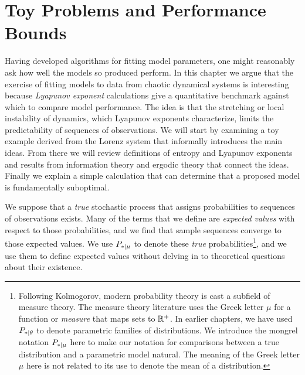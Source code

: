 

\chapter{Toy Problems and Performance Bounds}
\label{chap:toys}

Having developed algorithms for fitting model parameters, one might
reasonably ask how well the models so produced perform.  In this
chapter we argue that the exercise of fitting models to data from
chaotic dynamical systems is interesting because \emph{Lyapunov
  exponent} calculations give a quantitative benchmark against which
to compare model performance.  The idea is that the stretching or
local instability of dynamics, which Lyapunov exponents characterize,
limits the predictability  of sequences of
observations.  We will start by examining a toy example derived from
the Lorenz system that informally introduces the main ideas.  From
there we will review definitions of entropy and Lyapunov exponents and
results from information theory and ergodic theory that connect the
ideas.  Finally we explain a simple calculation that can determine
that a proposed model is fundamentally suboptimal.

We suppose that a \emph{true} stochastic process that assigns
probabilities to sequences of observations exists.  Many of the terms
that we define are \emph{expected values} with respect to those
probabilities, and we find that sample sequences converge to those
expected values.  We use $P_{*\mid \mu}$ to denote these \emph{true}
probabilities\footnote{Following Kolmogorov, modern probability theory
  is cast a subfield of measure theory.  The measure theory literature
  uses the Greek letter $\mu$ for a function or \emph{measure} that
  maps sets to $\mathbb{R}^+$.  In earlier chapters, we have used
  $P_{*\mid \theta}$ to denote parametric families of distributions.  We
  introduce the mongrel notation $P_{*\mid \mu}$ here to make our notation
  for comparisons between a true distribution and a parametric model
  natural.  The meaning of the Greek letter $\mu$ here is not related
  to its use to denote the mean of a distribution.}, and we use them
to define expected values without delving in to theoretical questions
about their existence.


